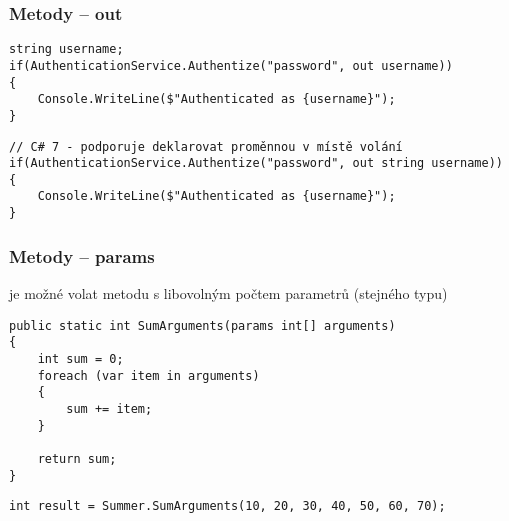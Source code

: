 \begin{frame}[fragile]
\frametitle{Metody -- out}
\vfill
\begin{yesblock}
\begin{lstlisting}[basicstyle=\small]
string username;
if(AuthenticationService.Authentize("password", out username))
{
    Console.WriteLine($"Authenticated as {username}");
}
\end{lstlisting}
\end{yesblock}
\vfill
\begin{yesblock}
\begin{lstlisting}[basicstyle=\small]
// C# 7 - podporuje deklarovat proměnnou v místě volání
if(AuthenticationService.Authentize("password", out string username))
{
    Console.WriteLine($"Authenticated as {username}");
}
\end{lstlisting}
\end{yesblock}
\vfill
\end{frame}




\nezkouskove

\begin{frame}[fragile]
\frametitle{Metody -- params}
\begin{bitemize}{}
\item je možné volat metodu s libovolným počtem parametrů (stejného typu)
\end{bitemize}
\vfill
\begin{yesblock}
\begin{lstlisting}[basicstyle=\small]
public static int SumArguments(params int[] arguments)
{
    int sum = 0;
    foreach (var item in arguments)
    {
        sum += item;
    }

    return sum;
}
\end{lstlisting}
\end{yesblock}
\vfill
\begin{yesblock}
\begin{lstlisting}[basicstyle=\small]
int result = Summer.SumArguments(10, 20, 30, 40, 50, 60, 70);
\end{lstlisting}
\end{yesblock}
\end{frame}





